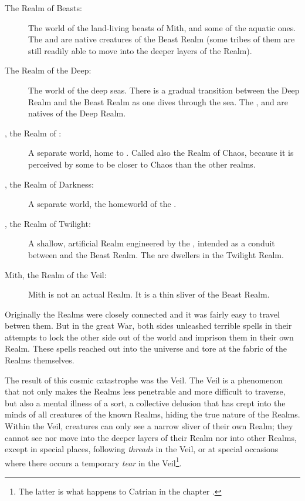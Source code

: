 \begin{description}
	\item[The Realm of Beasts:] The world of the land-living beasts of Mith, and some of the aquatic ones. The \nephilim{} and \meccara{} are native creatures of the Beast Realm (some tribes of them are still readily able to move into the deeper layers of the Realm). 
	\item[The Realm of the Deep:] The world of the deep seas. There is a gradual transition between the Deep Realm and the Beast Realm as one dives through the sea. The \krakens, \nagae{} and \vlekkeshsala{} are natives of the Deep Realm.
	\item[\Machai, the Realm of \Daemons:] A separate world, home to \daemons. Called also the Realm of Chaos, because it is perceived by some to be closer to Chaos than the other realms. 
	\item[\Erebos, the Realm of Darkness:] A separate world, the homeworld of the \banes. 
	\item[\Nyx, the Realm of Twilight:] A shallow, artificial Realm engineered by the \banes, intended as a conduit between \Erebos{} and the Beast Realm. The \resphain{} are dwellers in the Twilight Realm.
	\item[Mith, the Realm of the Veil:] Mith is not an actual Realm. It is a thin sliver of the Beast Realm. 
\end{description}

Originally the Realms were closely connected and it was fairly easy to travel betwen them. But in the great \Resphan{} War, both sides unleashed terrible spells in their attempts to lock the other side out of the world and imprison them in their own Realm. These spells reached out into the universe and tore at the fabric of the Realms themselves. 


The result of this cosmic catastrophe was the Veil. The Veil is a phenomenon that not only makes the Realms less penetrable and more difficult to traverse, but also a mental illness of a sort, a collective delusion that has crept into the minds of all creatures of the known Realms, hiding the true nature of the Realms. Within the Veil, creatures can only see a narrow sliver of their own Realm; they cannot see nor move into the deeper layers of their Realm nor into other Realms, except in special places, following \emph{threads} in the Veil, or at special occasions where there occurs a temporary \emph{tear} in the Veil\footnote{The latter is what happens to Catrian in the chapter .}. 




